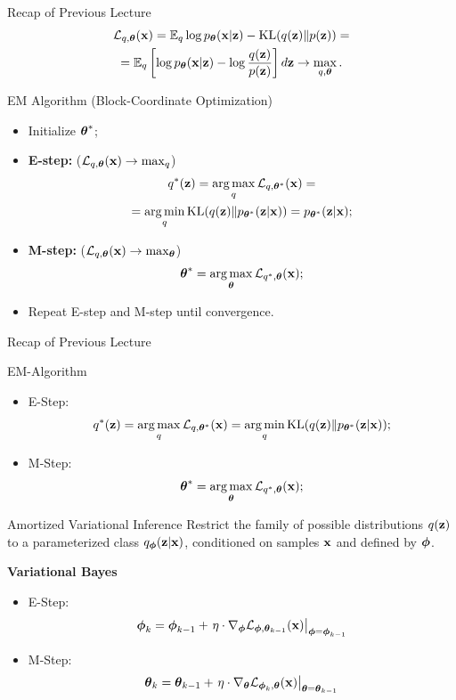 \documentclass{beamer}
\begin{document}
\begin{frame}{Recap of Previous Lecture}
	\vspace{-0.5cm}
	\begin{multline*}
		\mathcal{L}_{q, \boldsymbol{\theta}}(\mathbf{x})  =  \mathbb{E}_{q} \log p_{\boldsymbol{\theta}}(\mathbf{x} | \mathbf{z}) - \mathrm{KL} (q(\mathbf{z}) \| p(\mathbf{z})) = \\ = \mathbb{E}_q \left[ \log p_{\boldsymbol{\theta}}(\mathbf{x} | \mathbf{z}) - \log \frac{q(\mathbf{z})}{p(\mathbf{z})} \right]d\mathbf{z} \rightarrow \max_{q, \boldsymbol{\theta}}.
	\end{multline*}
	\vspace{-0.5cm}
	\begin{block}{EM Algorithm (Block-Coordinate Optimization)}
		\begin{itemize}
			\item Initialize $\boldsymbol{\theta}^*$;
			\item \textbf{E-step:} ($\mathcal{L}_{q, \boldsymbol{\theta}}(\mathbf{x}) \rightarrow \max_q$)
			\vspace{-0.2cm}
			\begin{multline*}
				q^*(\mathbf{z}) = \operatorname*{arg\,max}_q \mathcal{L}_{q, \boldsymbol{\theta}^*}(\mathbf{x}) = \\
				= \operatorname*{arg\,min}_q \mathrm{KL}(q(\mathbf{z}) \| p_{\boldsymbol{\theta}^*}(\mathbf{z} | \mathbf{x})) = p_{\boldsymbol{\theta}^*}(\mathbf{z}| \mathbf{x});
			\end{multline*}
			\item \textbf{M-step:} ($\mathcal{L}_{q, \boldsymbol{\theta}}(\mathbf{x}) \rightarrow \max_{\boldsymbol{\theta}}$)
			\vspace{-0.2cm}
			\[
				\boldsymbol{\theta}^* = \operatorname*{arg\,max}_{\boldsymbol{\theta}} \mathcal{L}_{q^*, \boldsymbol{\theta}}(\mathbf{x});
			\]
			\vspace{-0.2cm}
			\item Repeat E-step and M-step until convergence.
		\end{itemize}
	\end{block}
\end{frame}
\begin{frame}{Recap of Previous Lecture}
	\begin{block}{EM-Algorithm}
		\begin{itemize}
			\item E-Step:
			\[
				q^*(\mathbf{z}) = \operatorname*{arg\,max}_q \mathcal{L}_{q, \boldsymbol{\theta}^*}(\mathbf{x})
				= \operatorname*{arg\,min}_q \mathrm{KL}(q(\mathbf{z}) \| p_{\boldsymbol{\theta}^*}(\mathbf{z} | \mathbf{x}));
			\]
			\item M-Step:
			\[
				\boldsymbol{\theta}^* = \operatorname*{arg\,max}_{\boldsymbol{\theta}} \mathcal{L}_{q^*, \boldsymbol{\theta}}(\mathbf{x});
			\]
		\end{itemize}
	\end{block}
	\vspace{-0.5cm}
	\begin{block}{Amortized Variational Inference}
		Restrict the family of possible distributions $q(\mathbf{z})$ to a parameterized class $q_{\boldsymbol{\phi}}(\mathbf{z}| \mathbf{x})$, conditioned on samples $\mathbf{x}$ and defined by $\boldsymbol{\phi}$.
	\end{block}
	\textbf{Variational Bayes}
	\begin{itemize}
		\item E-Step:
		\[
			\boldsymbol{\phi}_k = \boldsymbol{\phi}_{k-1} + \left.\eta \cdot \nabla_{\boldsymbol{\phi}} \mathcal{L}_{\boldsymbol{\phi}, \boldsymbol{\theta}_{k-1}}(\mathbf{x})\right|_{\boldsymbol{\phi}=\boldsymbol{\phi}_{k-1}}
		\]
		\item M-Step:
		\[
			\boldsymbol{\theta}_k = \boldsymbol{\theta}_{k-1} + \left.\eta \cdot \nabla_{\boldsymbol{\theta}} \mathcal{L}_{\boldsymbol{\phi}_k, \boldsymbol{\theta}}(\mathbf{x})\right|_{\boldsymbol{\theta}=\boldsymbol{\theta}_{k-1}}
		\]
	\end{itemize}
\end{frame}
\end{document}
